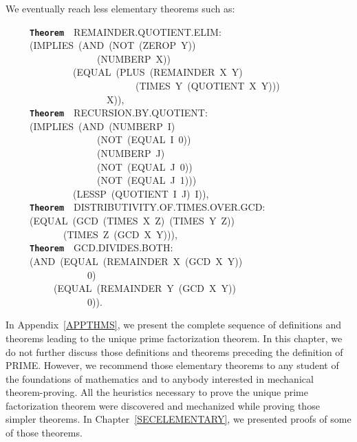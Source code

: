 \documentclass[11pt]{book}
\newenvironment{pubasis}{\begin{flushleft}\ttfamily\small}{\normalsize\rmfamily\end{flushleft}}
\newcommand{\axiomordefinition}[1]{\vspace{6pt}\texttt{\textbf{#1}}}
\begin{document}
We eventually reach less elementary theorems such as:
\begin{pubasis}
~~~~~\axiomordefinition{Theorem}~~REMAINDER.QUOTIENT.ELIM:\\
~~~~~(IMPLIES~(AND~(NOT~(ZEROP~Y))\\
~~~~~~~~~~~~~~~~~~~(NUMBERP~X))\\
~~~~~~~~~~~~~~(EQUAL~(PLUS~(REMAINDER~X~Y)\\
~~~~~~~~~~~~~~~~~~~~~~~~~~~(TIMES~Y~(QUOTIENT~X~Y)))\\
~~~~~~~~~~~~~~~~~~~~~X)),\\

~~~~~\axiomordefinition{Theorem}~~RECURSION.BY.QUOTIENT:\\
~~~~~(IMPLIES~(AND~(NUMBERP~I)\\
~~~~~~~~~~~~~~~~~~~(NOT~(EQUAL~I~0))\\
~~~~~~~~~~~~~~~~~~~(NUMBERP~J)\\
~~~~~~~~~~~~~~~~~~~(NOT~(EQUAL~J~0))\\
~~~~~~~~~~~~~~~~~~~(NOT~(EQUAL~J~1)))\\
~~~~~~~~~~~~~~(LESSP~(QUOTIENT~I~J)~I)),\\

~~~~~\axiomordefinition{Theorem}~~DIS\-TRI\-BU\-TIV\-ITY.OF.TIMES.OVER.GCD:\\
~~~~~(EQUAL~(GCD~(TIMES~X~Z)~(TIMES~Y~Z))\\
~~~~~~~~~~~~(TIMES~Z~(GCD~X~Y))),\\

~~~~~\axiomordefinition{Theorem}~~GCD.DIVIDES.BOTH:\\
~~~~~(AND~(EQUAL~(REMAINDER~X~(GCD~X~Y))\\
~~~~~~~~~~~~~~~~~0)\\
~~~~~~~~~~(EQUAL~(REMAINDER~Y~(GCD~X~Y))\\
~~~~~~~~~~~~~~~~~0)).\\
\end{pubasis}
In Appendix~\ref{APPTHMS}, we present the complete sequence of definitions
and theorems leading to the unique prime factorization theorem.
In this chapter, we do not further discuss
those definitions and theorems preceding the definition of PRIME.
However, we recommend those elementary theorems to any student
of the foundations of mathematics and to anybody interested in
mechanical theorem-proving.  All the heuristics
necessary to prove the unique prime factorization theorem were discovered
and mechanized while proving those simpler theorems.  In Chapter~\ref{SECELEMENTARY},
we presented proofs of some of those theorems.
\end{document}
